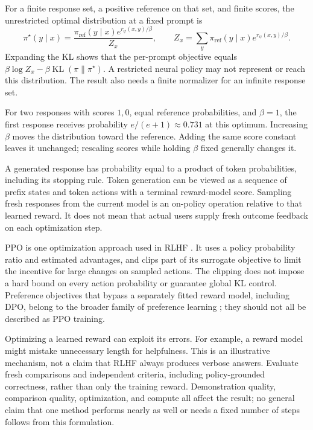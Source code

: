 For a finite response set, a positive reference on that set, and finite scores, the unrestricted optimal distribution at a fixed prompt is
\[
\pi^\star(y\mid x)=
\frac{\pi_{\mathrm{ref}}(y\mid x)e^{r_\psi(x,y)/\beta}}{Z_x},
\qquad
Z_x=\sum_y\pi_{\mathrm{ref}}(y\mid x)e^{r_\psi(x,y)/\beta}.
\]
Expanding the KL shows that the per-prompt objective equals $\beta\log Z_x-\beta\operatorname{KL}(\pi\|\pi^\star)$. A restricted neural policy may not represent or reach this distribution. The result also needs a finite normalizer for an infinite response set.

For two responses with scores $1,0$, equal reference probabilities, and $\beta=1$, the first response receives probability $e/(e+1)\approx0.731$ at this optimum. Increasing $\beta$ moves the distribution toward the reference. Adding the same score constant leaves it unchanged; rescaling scores while holding $\beta$ fixed generally changes it.

A generated response has probability equal to a product of token probabilities, including its stopping rule. Token generation can be viewed as a sequence of prefix states and token actions with a terminal reward-model score. Sampling fresh responses from the current model is an on-policy operation relative to that learned reward. It does not mean that actual users supply fresh outcome feedback on each optimization step.

PPO is one optimization approach used in RLHF \citep{schulman2017,ouyang2022}. It uses a policy probability ratio and estimated advantages, and clips part of its surrogate objective to limit the incentive for large changes on sampled actions. The clipping does not impose a hard bound on every action probability or guarantee global KL control. Preference objectives that bypass a separately fitted reward model, including DPO, belong to the broader family of preference learning \citep{rafailov2023}; they should not all be described as PPO training.

Optimizing a learned reward can exploit its errors. For example, a reward model might mistake unnecessary length for helpfulness. This is an illustrative mechanism, not a claim that RLHF always produces verbose answers. Evaluate fresh comparisons and independent criteria, including policy-grounded correctness, rather than only the training reward. Demonstration quality, comparison quality, optimization, and compute all affect the result; no general claim that one method performs nearly as well or needs a fixed number of steps follows from this formulation.

